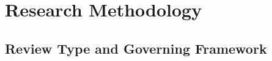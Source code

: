 %
%

\newcommand{\TODO}[1]{\textbf{[TODO: #1]}}

\section{Research Methodology}
\label{sec:methodology}

\subsection{Review Type and Governing Framework}
\label{sec:methodology:framework}


